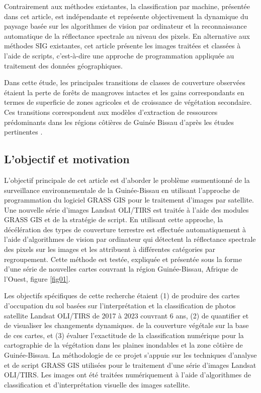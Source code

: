 \documentclass{rfpt}
\begin{document}
Contrairement aux méthodes existantes, la classification par machine, présentée dans cet article, est indépendante et représente objectivement la dynamique du paysage basée sur les algorithmes de vision par ordinateur et la reconnaissance automatique de la réflectance spectrale au niveau des pixels. En alternative aux méthodes SIG existantes, cet article présente les images traitées et classées à l’aide de scripts, c’est-à-dire une approche de programmation appliquée au traitement des données géographiques. 

Dans cette étude, les principales transitions de classes de couverture observées étaient la perte de forêts de mangroves intactes et les gains correspondants en termes de superficie de zones agricoles et de croissance de végétation secondaire. Ces transitions correspondent aux modèles d'extraction de ressources prédominants dans les régions côtières de Guinée Bissau d'après les études pertinentes \cite{PEREIRA2022100746,CARREIRAS2012426}.

\subsection{L'objectif et motivation}

L’objectif principale de cet article est d’aborder le problème susmentionné de la surveillance environnementale de la Guinée-Bissau en utilisant l’approche de programmation du logiciel GRASS GIS pour le traitement d’images par satellite. Une nouvelle série d’images Landsat OLI/TIRS est traitée à l’aide des modules GRASS GIS et de la stratégie de script. En utilisant cette approche, la décélération des types de couverture terrestre est effectuée automatiquement à l’aide d’algorithmes de vision par ordinateur qui détectent la réflectance spectrale des pixels sur les images et les attribuent à différentes catégories par regroupement. Cette méthode est testée, expliquée et présentée sous la forme d’une série de nouvelles cartes couvrant la région Guinée-Bissau, Afrique de l’Ouest, figure \ref{fig01}.

Les objectifs spécifiques de cette recherche étaient (1) de produire des cartes d'occupation du sol basées sur l'interprétation et la classification de photos satellite Landsat OLI/TIRS de 2017 à 2023 couvrant 6 ans, (2) de quantifier et de visualiser les changements dynamiques. de la couverture végétale sur la base de ces cartes, et (3) évaluer l'exactitude de la classification numérique pour la cartographie de la végétation dans les plaines inondables et la zone côtière de Guinée-Bissau. La méthodologie de ce projet s'appuie sur les techniques d'analyse et de script GRASS GIS utilisées pour le traitement d'une série d'images Landsat OLI/TIRS. Les images ont été traitées numériquement à l'aide d'algorithmes de classification et d'interprétation visuelle des images satellite.
\end{document}
